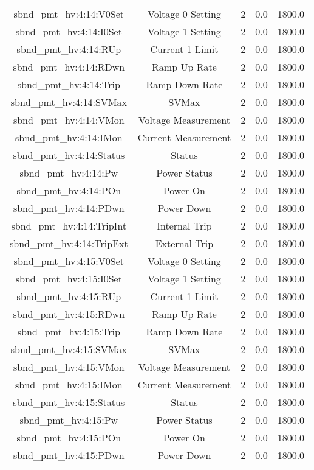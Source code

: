 \begin{center}
\begin{longtable}{c | c c c c }
sbnd\_pmt\_hv:4:14:V0Set & Voltage 0 Setting & 2 & 0.0 & 1800.0\\ 
sbnd\_pmt\_hv:4:14:I0Set & Voltage 1 Setting & 2 & 0.0 & 1800.0\\ 
sbnd\_pmt\_hv:4:14:RUp & Current 1 Limit & 2 & 0.0 & 1800.0\\ 
sbnd\_pmt\_hv:4:14:RDwn & Ramp Up Rate & 2 & 0.0 & 1800.0\\ 
sbnd\_pmt\_hv:4:14:Trip & Ramp Down Rate & 2 & 0.0 & 1800.0\\ 
sbnd\_pmt\_hv:4:14:SVMax & SVMax & 2 & 0.0 & 1800.0\\ 
sbnd\_pmt\_hv:4:14:VMon & Voltage Measurement & 2 & 0.0 & 1800.0\\ 
sbnd\_pmt\_hv:4:14:IMon & Current Measurement & 2 & 0.0 & 1800.0\\ 
sbnd\_pmt\_hv:4:14:Status & Status & 2 & 0.0 & 1800.0\\ 
sbnd\_pmt\_hv:4:14:Pw & Power Status & 2 & 0.0 & 1800.0\\ 
sbnd\_pmt\_hv:4:14:POn & Power On & 2 & 0.0 & 1800.0\\ 
sbnd\_pmt\_hv:4:14:PDwn & Power Down & 2 & 0.0 & 1800.0\\ 
sbnd\_pmt\_hv:4:14:TripInt & Internal Trip & 2 & 0.0 & 1800.0\\ 
sbnd\_pmt\_hv:4:14:TripExt & External Trip & 2 & 0.0 & 1800.0\\ 
sbnd\_pmt\_hv:4:15:V0Set & Voltage 0 Setting & 2 & 0.0 & 1800.0\\ 
sbnd\_pmt\_hv:4:15:I0Set & Voltage 1 Setting & 2 & 0.0 & 1800.0\\ 
sbnd\_pmt\_hv:4:15:RUp & Current 1 Limit & 2 & 0.0 & 1800.0\\ 
sbnd\_pmt\_hv:4:15:RDwn & Ramp Up Rate & 2 & 0.0 & 1800.0\\ 
sbnd\_pmt\_hv:4:15:Trip & Ramp Down Rate & 2 & 0.0 & 1800.0\\ 
sbnd\_pmt\_hv:4:15:SVMax & SVMax & 2 & 0.0 & 1800.0\\ 
sbnd\_pmt\_hv:4:15:VMon & Voltage Measurement & 2 & 0.0 & 1800.0\\ 
sbnd\_pmt\_hv:4:15:IMon & Current Measurement & 2 & 0.0 & 1800.0\\ 
sbnd\_pmt\_hv:4:15:Status & Status & 2 & 0.0 & 1800.0\\ 
sbnd\_pmt\_hv:4:15:Pw & Power Status & 2 & 0.0 & 1800.0\\ 
sbnd\_pmt\_hv:4:15:POn & Power On & 2 & 0.0 & 1800.0\\ 
sbnd\_pmt\_hv:4:15:PDwn & Power Down & 2 & 0.0 & 1800.0\\ 

\end{longtable}
\end{center}
